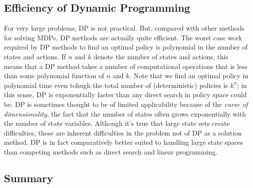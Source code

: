 \documentclass[12pt]{article}
\begin{document}
\subsection{Efficiency of Dynamic Programming}
For very large problems, DP is not practical. But, compared with other methods for solving MDPs, DP methods are actually quite efficient. The worst case work required by DP methods to find an optimal policy is polynomial in the number of states and actions. If $n$ and $k$ denote the number of states and actions, this means that a DP method takes a number of computational operations that is less than some polynomial function of $n$ and $k$. Note that we find an optimal policy in polynomial time even tohugh the total number of (deterministic) policies is $k^n$; in this sense, DP is exponentially faster than any direct search in policy space could be. DP is sometimes thought to be of limited applicability because of the \emph{curse of dimensionality}, the fact that the number of states often grows exponentially with the number of state variables. Although it's true that large state sets create difficulties, these are inherent difficulties in the problem not of DP as a solution method. DP is in fact comparatively better suited to handling large state spaces than competing methods such as direct search and linear programming.

\subsection{Summary}
\end{document}
